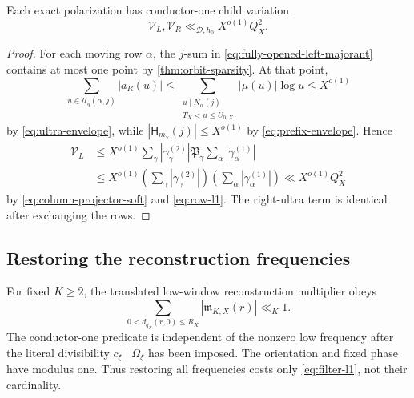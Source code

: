 \begin{proposition}
\label{prop:polarization-bound}
Each exact polarization has conductor-one child variation
\[
 \mathcal V_L,\mathcal V_R
 \ll_{\mathscr D,h_0}X^{o(1)}Q_X^2.
\]
\end{proposition}

\begin{proof}
For each moving row \(\alpha\), the \(j\)-sum in
\eqref{eq:fully-opened-left-majorant} contains at most one point by
\cref{thm:orbit-sparsity}.  At that point,
\[
 \sum_{u\in\mathcal U_q(\alpha,j)}|a_R(u)|
 \le
 \sum_{\substack{u\mid N_\alpha(j)\\T_X<u\le U_{0,X}}}
 |\mu(u)|\log u
 \le X^{o(1)}
\]
by \eqref{eq:ultra-envelope}, while
\(|\mathsf H_{m_\gamma}(j)|\le X^{o(1)}\) by
\eqref{eq:prefix-envelope}.  Hence
\begin{align*}
 \mathcal V_L
 &\le
 X^{o(1)}
 \sum_\gamma|\gamma_\gamma^{(2)}|\mathfrak P_\gamma
 \sum_\alpha|\gamma_\alpha^{(1)}|\\
 &\le
 X^{o(1)}
 \left(\sum_\gamma|\gamma_\gamma^{(2)}|\right)
 \left(\sum_\alpha|\gamma_\alpha^{(1)}|\right)
 \ll X^{o(1)}Q_X^2
\end{align*}
by \eqref{eq:column-projector-soft} and \eqref{eq:row-l1}.
The right-ultra term is identical after exchanging the rows.
\end{proof}

\subsection{Restoring the reconstruction frequencies}

For fixed \(K\ge2\), the translated low-window reconstruction
multiplier obeys
\begin{equation}
 \sum_{0<d_{q_X}(r,0)\le R_X}
 |\mathfrak m_{K,X}(r)|
 \ll_K1.
\label{eq:filter-l1}
\end{equation}
The conductor-one predicate is independent of the nonzero low
frequency after the literal divisibility \(c_\xi\mid\Omega_\xi\) has
been imposed.  The orientation and fixed phase have modulus one.
Thus restoring all frequencies costs only
\eqref{eq:filter-l1}, not their cardinality.

